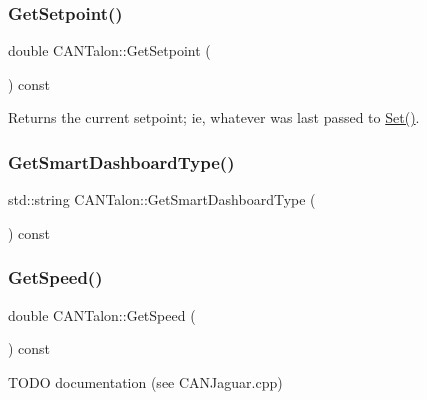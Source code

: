 \subsubsection{\texorpdfstring{Get\+Setpoint()}{GetSetpoint()}}
{\footnotesize\ttfamily double C\+A\+N\+Talon\+::\+Get\+Setpoint (\begin{DoxyParamCaption}{ }\end{DoxyParamCaption}) const\hspace{0.3cm}{\ttfamily [override]}}

\begin{DoxyReturn}{Returns}
the current setpoint; ie, whatever was last passed to \hyperlink{class_c_a_n_talon_a4562f7fb454693a0b19e6eba955a0c71}{Set()}. 
\end{DoxyReturn}
\mbox{\label{class_c_a_n_talon_adedfa57e6f2ef854ec07c0587a37a436}} 
\subsubsection{\texorpdfstring{Get\+Smart\+Dashboard\+Type()}{GetSmartDashboardType()}}
{\footnotesize\ttfamily std\+::string C\+A\+N\+Talon\+::\+Get\+Smart\+Dashboard\+Type (\begin{DoxyParamCaption}{ }\end{DoxyParamCaption}) const\hspace{0.3cm}{\ttfamily [override]}}

\mbox{\label{class_c_a_n_talon_a36e486b58bc5ce1b218d36468900bb1b}} 
\subsubsection{\texorpdfstring{Get\+Speed()}{GetSpeed()}}
{\footnotesize\ttfamily double C\+A\+N\+Talon\+::\+Get\+Speed (\begin{DoxyParamCaption}{ }\end{DoxyParamCaption}) const\hspace{0.3cm}{\ttfamily [override]}}

T\+O\+DO documentation (see C\+A\+N\+Jaguar.\+cpp)

